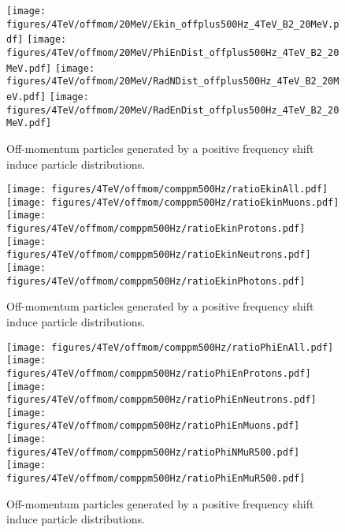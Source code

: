 \begin{figure}[!htb]
\begin{center}
  \texttt{[image: figures/4TeV/offmom/20MeV/Ekin\_offplus500Hz\_4TeV\_B2\_20MeV.pdf]}
  \texttt{[image: figures/4TeV/offmom/20MeV/PhiEnDist\_offplus500Hz\_4TeV\_B2\_20MeV.pdf]}
  \texttt{[image: figures/4TeV/offmom/20MeV/RadNDist\_offplus500Hz\_4TeV\_B2\_20MeV.pdf]}
  \texttt{[image: figures/4TeV/offmom/20MeV/RadEnDist\_offplus500Hz\_4TeV\_B2\_20MeV.pdf]}
\end{center}
\vspace{-0.6cm}
 \caption{Off-momentum particles generated by a positive frequency shift induce particle distributions.
  \label{offmom4TeV}}
\end{figure}


\begin{figure}[!htb]
\begin{center}
  \texttt{[image: figures/4TeV/offmom/comppm500Hz/ratioEkinAll.pdf]}
  \texttt{[image: figures/4TeV/offmom/comppm500Hz/ratioEkinMuons.pdf]}
  \texttt{[image: figures/4TeV/offmom/comppm500Hz/ratioEkinProtons.pdf]}
  \texttt{[image: figures/4TeV/offmom/comppm500Hz/ratioEkinNeutrons.pdf]}
  \texttt{[image: figures/4TeV/offmom/comppm500Hz/ratioEkinPhotons.pdf]}
\end{center}
\vspace{-0.6cm}
 \caption{Off-momentum particles generated by a positive frequency shift induce particle distributions.
  \label{compPM_ekin}}
\end{figure}

\begin{figure}[!htb]
\begin{center}
  \texttt{[image: figures/4TeV/offmom/comppm500Hz/ratioPhiEnAll.pdf]}
  \texttt{[image: figures/4TeV/offmom/comppm500Hz/ratioPhiEnProtons.pdf]}
  \texttt{[image: figures/4TeV/offmom/comppm500Hz/ratioPhiEnNeutrons.pdf]}
  \texttt{[image: figures/4TeV/offmom/comppm500Hz/ratioPhiEnMuons.pdf]}
  \texttt{[image: figures/4TeV/offmom/comppm500Hz/ratioPhiNMuR500.pdf]}
  \texttt{[image: figures/4TeV/offmom/comppm500Hz/ratioPhiEnMuR500.pdf]}
\end{center}
\vspace{-0.6cm}
 \caption{Off-momentum particles generated by a positive frequency shift induce particle distributions.
  \label{compPM_phien}}
\end{figure}

